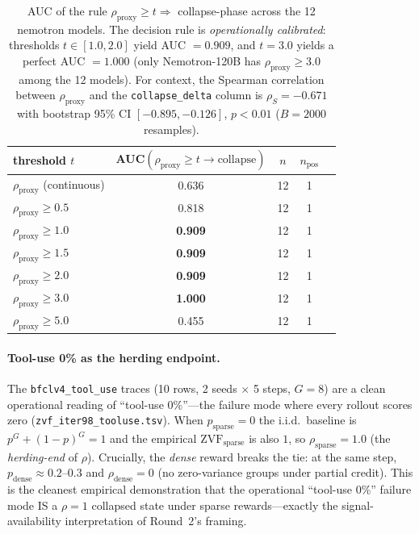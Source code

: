 \begin{table}[ht]\centering\small
\begin{tabular}{lcccc}
\toprule
threshold $t$ & AUC$(\rho_{\mathrm{proxy}} \ge t \to \mathrm{collapse})$ & $n$ & $n_{\mathrm{pos}}$ \\
\midrule
$\rho_{\mathrm{proxy}}$ (continuous) & 0.636 & 12 & 1 \\
$\rho_{\mathrm{proxy}} \ge 0.5$ & 0.818 & 12 & 1 \\
$\rho_{\mathrm{proxy}} \ge 1.0$ & \textbf{0.909} & 12 & 1 \\
$\rho_{\mathrm{proxy}} \ge 1.5$ & \textbf{0.909} & 12 & 1 \\
$\rho_{\mathrm{proxy}} \ge 2.0$ & \textbf{0.909} & 12 & 1 \\
$\rho_{\mathrm{proxy}} \ge 3.0$ & \textbf{1.000} & 12 & 1 \\
$\rho_{\mathrm{proxy}} \ge 5.0$ & 0.455 & 12 & 1 \\
\bottomrule
\end{tabular}
\caption{AUC of the rule $\rho_{\mathrm{proxy}} \ge t \Rightarrow$
collapse-phase across the 12 nemotron models. The decision rule is
\emph{operationally calibrated}: thresholds $t \in [1.0, 2.0]$ yield
AUC $= 0.909$, and $t = 3.0$ yields a perfect AUC $= 1.000$ (only
Nemotron-120B has $\rho_{\mathrm{proxy}} \ge 3.0$ among the 12 models).
For context, the Spearman correlation between $\rho_{\mathrm{proxy}}$
and the \texttt{collapse\_delta} column is
$\rho_S = -0.671$ with bootstrap 95\% CI $[-0.895, -0.126]$,
$p < 0.01$ ($B{=}2000$ resamples).}
\label{tab:zvf-auc}
\end{table}

\paragraph{Tool-use 0\% as the herding endpoint.}
The \texttt{bfclv4\_tool\_use} traces (10 rows, 2 seeds $\times$ 5
steps, $G{=}8$) are a clean operational reading of ``tool-use
0\%''---the failure mode where every rollout scores zero
(\texttt{zvf\_iter98\_tooluse.tsv}). When
$p_{\mathrm{sparse}}=0$ the i.i.d.\ baseline is
$p^{G}+(1-p)^{G} = 1$ and the empirical $\mathrm{ZVF}_{\mathrm{sparse}}$ is
also $1$, so $\rho_{\mathrm{sparse}}=1.0$ (the \emph{herding-end} of
$\rho$). Crucially, the \emph{dense} reward breaks the tie: at the
same step, $p_{\mathrm{dense}}\approx 0.2$--$0.3$ and
$\rho_{\mathrm{dense}}=0$ (no zero-variance groups under partial
credit). This is the cleanest empirical demonstration that the
operational ``tool-use 0\%'' failure mode IS a $\rho=1$ collapsed
state under sparse rewards---exactly the signal-availability
interpretation of Round~2's framing.

